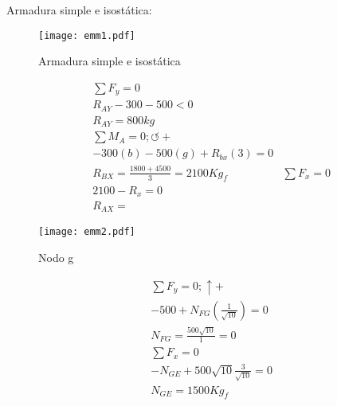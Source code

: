 Armadura simple e isostática:

\begin{figure}[h!]
\centering
  \texttt{[image: emm1.pdf]}
  \caption{Armadura simple e isostática}
  \label{emm1}
\end{figure}
\begin{align*}
    &\sum F_y = 0\\
    &R_{ AY} - 300 - 500 < 0\\
    &R_{AY} = 800kg\\
    &\sum M_A = 0; \circlearrowleft +\\
    &- 300(b) - 500(g) + R_{bx}(3) = 0 \\
    &R_{BX} = \frac{1800 + 4500 }{3} = 2100Kg_{f}
    &\sum F_x = 0\\
    &2100 - R_x = 0\\
    & R_{AX} =
\end{align*}
\begin{figure}[h!]
\centering
  \texttt{[image: emm2.pdf]}
  \caption{Nodo g}
  \label{emm2}
\end{figure}
\begin{align*}
    &\sum F_y = 0; \uparrow +\\
    &- 500 + N_{FG}\left(\frac{1}{\sqrt{10}}\right) = 0\\
    &N_{FG} = \frac{500 \sqrt{10}}{1} = 0\\
    &\sum F_x = 0\\
    &- N_{GE} + 500 \sqrt{10}\frac{3}{\sqrt{10}}  =  0 \\
    & N_{GE} = 1500 Kg_f
\end{align*}



